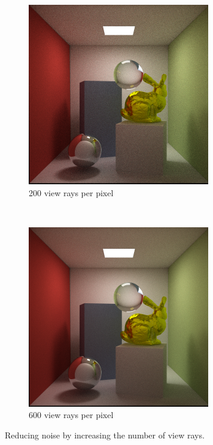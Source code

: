 \documentclass[a4paper, 12pt]{report}
\begin{document}
\begin{figure}
   \begin{subfigure}[b]{0.5\textwidth}
                 \includegraphics[width=\textwidth]{figures/specular_200rpp-.png}
                 \caption{200 view rays per pixel}
                 \label{fig:200rpp}
         \end{subfigure}%
  ~
  \begin{subfigure}[b]{0.5\textwidth}
                \includegraphics[width=\textwidth]{figures/specular_600rpp-.png}
                \caption{600 view rays per pixel}
                \label{fig:600rpp}
       \end{subfigure}
        \caption{Reducing noise by increasing the number of view rays.}\label{fig:vew_rays}
\end{figure}
\end{document}
